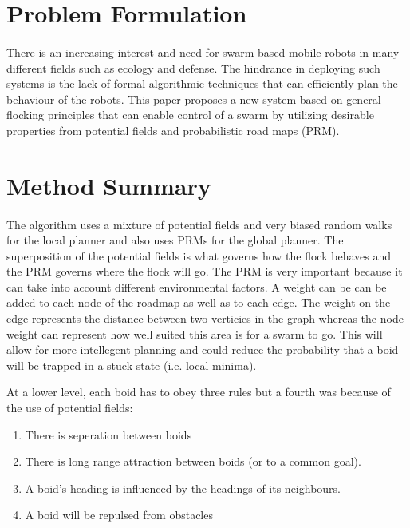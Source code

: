 \documentclass[12pt]{article}
\begin{document}
\section{Problem Formulation}
\paragraph{} There is an increasing interest and need for swarm based mobile robots in many different fields such as ecology and defense. The hindrance in deploying such systems is the lack of formal algorithmic techniques that can efficiently plan the behaviour of the robots. This paper proposes a new system based on general flocking principles that can enable control of a swarm by utilizing desirable properties from potential fields and probabilistic road maps (PRM).

\section{Method Summary}
\paragraph{} The algorithm uses a mixture of potential fields and very biased random walks for the local planner and also uses PRMs for the global planner. The superposition of the potential fields is what governs how the flock behaves and the PRM governs where the flock will go. The PRM is very important because it can take into account different environmental factors. A weight can be can be added to each node of the roadmap as well as to each edge. The weight on the edge represents the distance between two verticies in the graph whereas the node weight can represent how well suited this area is for a swarm to go. This will allow for more intellegent planning and could reduce the probability that a boid will be trapped in a stuck state (i.e. local minima). 

At a lower level, each boid has to obey three rules but a fourth was because of the use of potential fields: 
\begin{enumerate}
\item There is seperation between boids
\item There is long range attraction between boids (or to a common goal). 
\item A boid's heading is influenced by the headings of its neighbours.
\item A boid will be repulsed from obstacles
\end{enumerate}
\end{document}
